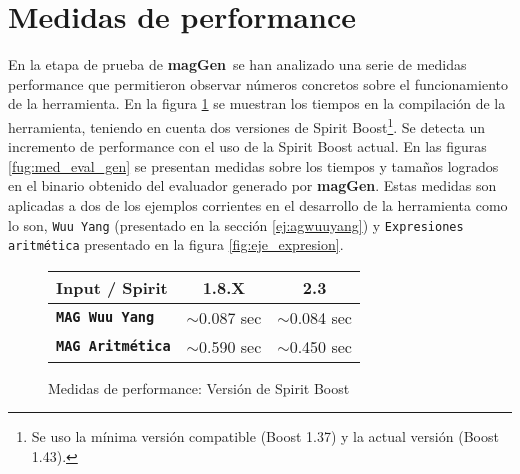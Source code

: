 \documentclass[runningheads,a4paper]{llncs}
\newcommand{\textbtt}[1]{\texttt{\textbf{#1}}}
\newcommand{\maggen}{\textbf{magGen}}
\begin{document}
\section{Medidas de performance}
\vspace{-0.2cm}
En la etapa de prueba de \maggen\ se han analizado una serie de medidas performance que permitieron observar números concretos sobre el funcionamiento de la herramienta. En la figura \ref{fig:version_boot} se muestran los tiempos en la compilación de la herramienta, teniendo en cuenta dos versiones de Spirit Boost\footnote{Se uso la mínima versión compatible (Boost 1.37) y la actual versión (Boost 1.43).}. Se detecta un incremento de performance con el uso de la Spirit Boost actual.
En las figuras \ref{fug:med_eval_gen} se presentan medidas sobre los tiempos y tamaños logrados en el binario obtenido del evaluador generado por \maggen. Estas medidas son aplicadas a dos de los ejemplos corrientes en el desarrollo de la herramienta como lo son,  \texttt{Wuu Yang} (presentado en la sección \ref{ej:agwuuyang}) y \texttt{Expresiones aritmética} presentado en la figura \ref{fig:eje_expresion}. 

\begin{figure}
    \vspace{-0.5cm}
    \begin{center}
        \setlength{\doublerulesep}{0mm}
        \setlength{\arrayrulewidth}{0.9pt}
        \begin{tabular}{|l||c|c|}
            \hline
            \rowcolor{gris} Input / Spirit           & \textbf{1.8.X}   & \textbf{2.3}   \\ \hline
            \rowcolor{white}\textbtt{MAG Wuu Yang}   & $\sim$0.087 sec & $\sim$0.084 sec \\ \hline
            \rowcolor{white}\textbtt{MAG Aritmética} & $\sim$0.590 sec & $\sim$0.450 sec \\ \hline
        \end{tabular}
    \end{center}
    \vspace{-0,5cm}
    \caption{\label{fig:version_boot}Medidas de performance: Versión de Spirit Boost}
\end{figure}
\end{document}
